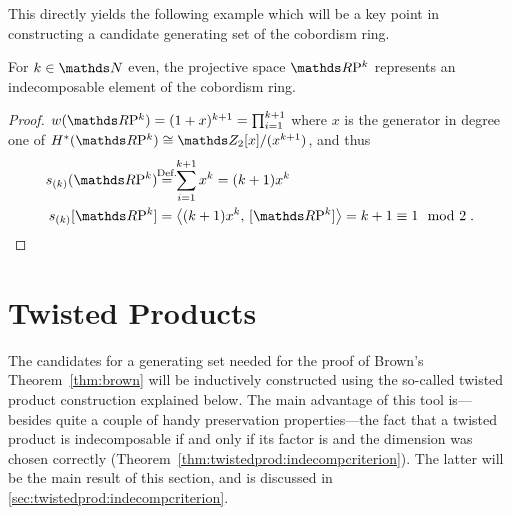 This directly yields the following example which will be a key point
in constructing a candidate generating set of the cobordism ring.
\begin{Ex}\label{ex:rpnindecomposable}
  For $k\in\Nat$ even, the projective space $\RP k$ represents an
  indecomposable element of the cobordism ring.
  \begin{proof}
    $\W{\RP k} = (1+x)^{k+1}=\prod_{i=1}^{k+1}$ where $x$ is the
    generator in degree one of $\H^*(\RP k)\cong\Zmod2[x]/(x^{k+1})$,
    and thus
    \begin{align*}
      \s{(k)}(\RP k)
      &\cequalsby{Def.} \sum_{i=1}^{k+1} x^k
      = (k+1)x^k \\
      \snum{(k)}{\RP k}
      &= \capped{(k+1)x^k}{\fundcl{\RP k}}
      = k+1
        \equiv 1 \mod2
        \;.
        \qedhere
    \end{align*}
  \end{proof}
\end{Ex}

\section{Twisted Products}
\label{sec:twistedprod}
The candidates for a generating set needed for the proof of Brown's
Theorem~\autoref{thm:brown} will be inductively constructed
using the so-called twisted product construction explained below.
The main advantage of this tool is---besides quite a couple of handy
preservation properties---the fact that a twisted product is
indecomposable if and only if its factor is and the dimension was
chosen correctly
(Theorem~\autoref{thm:twistedprod:indecompcriterion}). The latter will
be the main result of this section, and is discussed in
\autoref{sec:twistedprod:indecompcriterion}.

